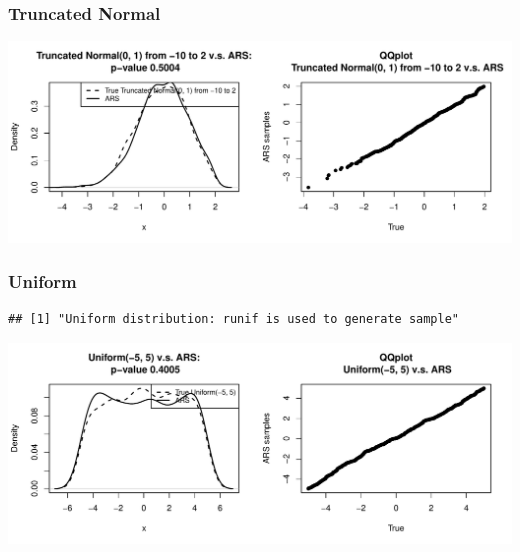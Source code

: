 \documentclass{article}\usepackage[]{graphicx}\usepackage[]{color}
\makeatletter
\def\maxwidth{ %
  \ifdim\Gin@nat@width>\linewidth
    \linewidth
  \else
    \Gin@nat@width
  \fi
}
\newenvironment{kframe}{%
 \def\at@end@of@kframe{}%
 \ifinner\ifhmode%
  \def\at@end@of@kframe{\end{minipage}}%
  \begin{minipage}{\columnwidth}%
 \fi\fi%
 \def\FrameCommand##1{\hskip\@totalleftmargin \hskip-\fboxsep
 \colorbox{shadecolor}{##1}\hskip-\fboxsep
     \hskip-\linewidth \hskip-\@totalleftmargin \hskip\columnwidth}%
 \MakeFramed {\advance\hsize-\width
   \@totalleftmargin\z@ \linewidth\hsize
   \@setminipage}}%
 {\par\unskip\endMakeFramed%
 \at@end@of@kframe}
\newenvironment{knitrout}{}{} %
\makeatother
\begin{document}
\subsubsection{Truncated Normal}
\begin{knitrout}
\color{fgcolor}
\includegraphics[width=\maxwidth]{figure/truncated_normal-1} 

\end{knitrout}

\subsubsection{Uniform}
\begin{knitrout}
\color{fgcolor}\begin{kframe}
\begin{verbatim}
## [1] "Uniform distribution: runif is used to generate sample"
\end{verbatim}
\end{kframe}
\includegraphics[width=\maxwidth]{figure/uniform-1} 

\end{knitrout}
\end{document}
